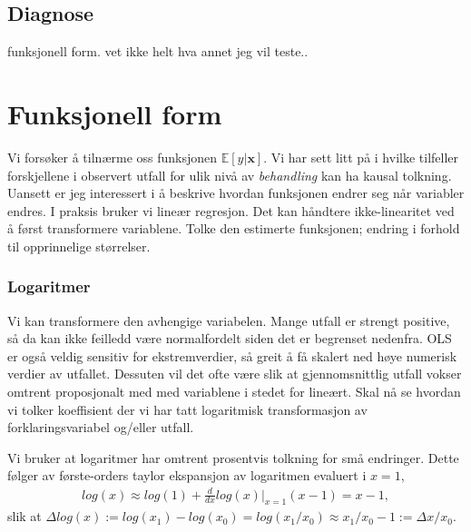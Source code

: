 \subsection{Diagnose}
funksjonell form. vet ikke helt hva annet jeg vil teste..
\section{Funksjonell form}
Vi forsøker å tilnærme oss funksjonen $\mathbb{E}[y|\mathbf{x}]$. Vi har sett litt på i hvilke tilfeller forskjellene i observert utfall for ulik nivå av \textit{behandling} kan ha kausal tolkning. Uansett er jeg interessert i å beskrive hvordan funksjonen endrer seg når variabler endres. I praksis bruker vi lineær regresjon. Det kan håndtere ikke-linearitet ved å først transformere variablene. Tolke den estimerte funksjonen; endring i forhold til opprinnelige størrelser.
\subsubsection{Logaritmer}
Vi kan transformere den avhengige variabelen. Mange utfall er strengt positive, så da kan ikke feilledd være normalfordelt siden det er begrenset nedenfra. OLS er også veldig sensitiv for ekstremverdier, så greit å få skalert ned høye numerisk verdier av utfallet. Dessuten vil det ofte være slik at gjennomsnittlig utfall vokser omtrent proposjonalt med med variablene i stedet for lineært. Skal nå se hvordan vi tolker koeffisient der vi har tatt logaritmisk transformasjon av forklaringsvariabel og/eller utfall.

Vi bruker at logaritmer har omtrent prosentvis tolkning for små endringer. Dette følger av første-orders taylor ekspansjon av logaritmen evaluert i $x=1$,
\begin{align}
log(x) \approx log(1)+\frac{d}{dx}log(x)|_{x=1}(x-1) = x-1,
\end{align}
slik at $\Delta log(x) := log(x_1)-log(x_0) = log(x_1/x_0) \approx x_1/x_0-1 := \Delta x /x_0$.
